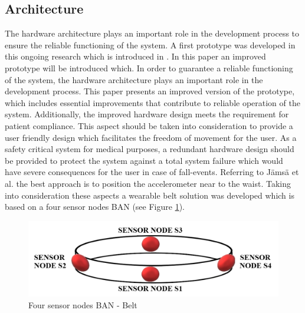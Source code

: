 \documentclass[review]{elsarticle}
\begin{document}
\subsection{Architecture}
\label{subsec:Architecture}	
The hardware architecture plays an important role in the development process to ensure the reliable functioning of the system. A first prototype was developed in this ongoing research which is introduced in \cite{LaBlunda.2016, LaBlunda.2016b}. In this paper an improved prototype will be introduced which. In order to guarantee a reliable functioning of the system, the hardware architecture plays an important role in the development process.  This paper presents an improved version of the prototype, which includes essential improvements that contribute to reliable operation of the system. Additionally, the improved hardware design meets the requirement for patient compliance. This aspect should be taken into consideration to provide a user friendly design which facilitates the freedom of movement for the user. As a safety critical system for medical purposes, a redundant hardware design should be provided to protect the system against a total system failure which would have severe consequences for the user in case of fall-events. Referring to J{\"a}ms{\"a} et al. \cite{jamsa2014fall} the best approach is to position the accelerometer near to the waist. Taking into consideration these aspects a wearable belt solution was developed which is based on a four sensor nodes BAN (see Figure \ref{fig:BanBelt}).
\begin{figure}[!ht]
	\centering
	\includegraphics[scale=0.41]{images/belt}
	\caption[Four sensor nodes BAN - Belt]{Four sensor nodes BAN - Belt \cite{LaBlunda.2016, LaBlunda.2016b}}
	\label{fig:BanBelt}
\end{figure}
\end{document}
